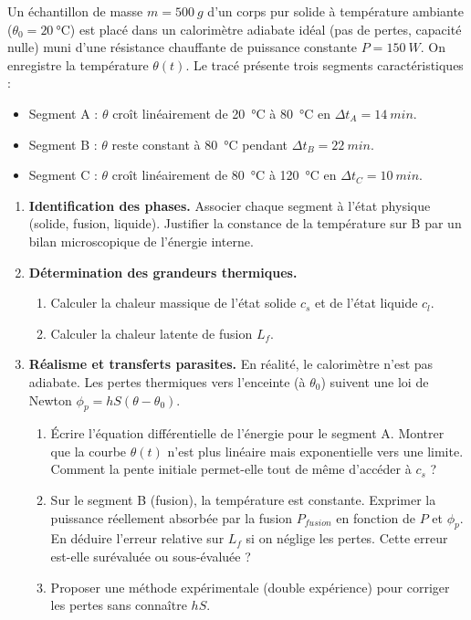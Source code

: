 \documentclass[11pt]{article}
\begin{document}
\begin{exercice}
Un échantillon de masse $m = \SI{500}{g}$ d'un corps pur solide à température ambiante ($\theta_0 = \SI{20}{\celsius}$) est placé dans un calorimètre adiabate idéal (pas de pertes, capacité nulle) muni d'une résistance chauffante de puissance constante $P = \SI{150}{W}$. On enregistre la température $\theta(t)$. Le tracé présente trois segments caractéristiques :
\begin{itemize}
    \item Segment A : $\theta$ croît linéairement de \SI{20}{\celsius} à \SI{80}{\celsius} en $\Delta t_A = \SI{14}{min}$.
    \item Segment B : $\theta$ reste constant à \SI{80}{\celsius} pendant $\Delta t_B = \SI{22}{min}$.
    \item Segment C : $\theta$ croît linéairement de \SI{80}{\celsius} à \SI{120}{\celsius} en $\Delta t_C = \SI{10}{min}$.
\end{itemize}

\begin{enumerate}
    \item \textbf{Identification des phases.} Associer chaque segment à l'état physique (solide, fusion, liquide). Justifier la constance de la température sur B par un bilan microscopique de l'énergie interne.
    \item \textbf{Détermination des grandeurs thermiques.} 
    \begin{enumerate}
        \item Calculer la chaleur massique de l'état solide $c_s$ et de l'état liquide $c_l$.
        \item Calculer la chaleur latente de fusion $L_f$.
    \end{enumerate}
    \item \textbf{Réalisme et transferts parasites.} En réalité, le calorimètre n'est pas adiabate. Les pertes thermiques vers l'enceinte (à $\theta_0$) suivent une loi de Newton $\phi_p = h S (\theta - \theta_0)$.
    \begin{enumerate}
        \item Écrire l'équation différentielle de l'énergie pour le segment A. Montrer que la courbe $\theta(t)$ n'est plus linéaire mais exponentielle vers une limite. Comment la pente initiale permet-elle tout de même d'accéder à $c_s$ ?
        \item Sur le segment B (fusion), la température est constante. Exprimer la puissance réellement absorbée par la fusion $P_{fusion}$ en fonction de $P$ et $\phi_p$. En déduire l'erreur relative sur $L_f$ si on néglige les pertes. Cette erreur est-elle surévaluée ou sous-évaluée ?
        \item Proposer une méthode expérimentale (double expérience) pour corriger les pertes sans connaître $hS$.
    \end{enumerate}
\end{enumerate}
\end{exercice}
\end{document}
